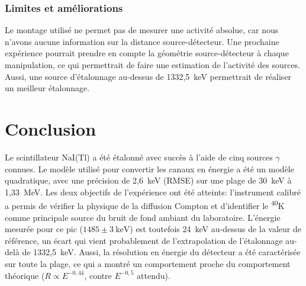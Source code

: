 \documentclass[11pt,letterpaper]{article}
\begin{document}
\subsubsection*{Limites et améliorations}
Le montage utilisé ne permet pas de mesurer une activité absolue, car nous n'avons aucune information sur la distance source-détecteur. Une prochaine expérience pourrait prendre en compte la géométrie source-détecteur à chaque manipulation, ce qui permettrait de faire une estimation de l'activité des sources. Aussi, une source d'étalonnage au-dessus de 1332,5~keV permettrait de réaliser un meilleur étalonnage.

\section{Conclusion}
\label{sec:conclusion}

Le scintillateur NaI(Tl) a été étalonné avec succès à l'aide de cinq sources $\gamma$ connues. Le modèle utilisé pour convertir les canaux en énergie a été un modèle quadratique, avec une précision de 2,6~keV (RMSE) sur une plage de 30~keV à 1,33~MeV. Les deux objectifs de l'expérience ont été atteints: l'instrument calibré a permis de vérifier la physique de la diffusion Compton et d'identifier le \textsuperscript{40}K comme principale source du bruit de fond ambiant du laboratoire. L'énergie mesurée pour ce pic ($1485 \pm 3~\text{keV}$) est toutefois 24~keV au-dessus de la valeur de référence, un écart qui vient probablement de l'extrapolation de l'étalonnage au-delà de 1332,5~keV. Aussi, la résolution en énergie du détecteur a été caractérisée sur toute la plage, ce qui a montré un comportement proche du comportement théorique ($R \propto E^{-0{,}44}$, contre $E^{-0{,}5}$ attendu).
\end{document}
